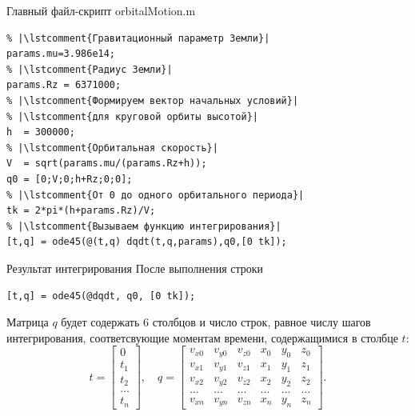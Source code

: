 \documentclass[11pt, compress]{beamer}
\newcommand{\lstcomment}[1]{\textcolor{dark-green}{\texttt{#1}}}
\begin{document}
\begin{frame}[fragile]{Главный файл-скрипт orbitalMotion.m}
\begin{lstlisting}
% |\lstcomment{Гравитационный параметр Земли}|
params.mu=3.986e14;
% |\lstcomment{Радиус Земли}|
params.Rz = 6371000;    
% |\lstcomment{Формируем вектор начальных условий}|
% |\lstcomment{для круговой орбиты высотой}|
h  = 300000;
% |\lstcomment{Орбитальная скорость}|
V  = sqrt(params.mu/(params.Rz+h));  
q0 = [0;V;0;h+Rz;0;0];
% |\lstcomment{От 0 до одного орбитального периода}|
tk = 2*pi*(h+params.Rz)/V;
% |\lstcomment{Вызываем функцию интегрирования}|
[t,q] = ode45(@(t,q) dqdt(t,q,params),q0,[0 tk]);  
\end{lstlisting}
\end{frame}






\begin{frame}[fragile]{Результат интегрирования}
После выполнения строки
\begin{lstlisting}
[t,q] = ode45(@dqdt, q0, [0 tk]);  
\end{lstlisting}
Матрица $q$ будет содержать 6 столбцов и число строк, равное числу шагов интегрирования, соответсвующие моментам времени, содержащимися в столбце $t$:
$$
  t = \begin{bmatrix} 0 \\ t_1 \\ t_2 \\ \ldots \\ t_n \end{bmatrix}, \quad
  q = 
\begin{bmatrix} 
  v_{x0} & v_{y0} & v_{z0} & x_{0} & y_{0} & z_{0} \\
  v_{x1} & v_{y1} & v_{z1} & x_{1} & y_{1} & z_{1} \\
  v_{x2} & v_{y2} & v_{z2} & x_{2} & y_{2} & z_{2} \\
  \ldots & \ldots & \ldots & \ldots & \ldots & \ldots \\
  v_{xn} & v_{yn} & v_{zn} & x_{n} & y_{n} & z_{n} 
\end{bmatrix}.
$$
\end{frame}
\end{document}
